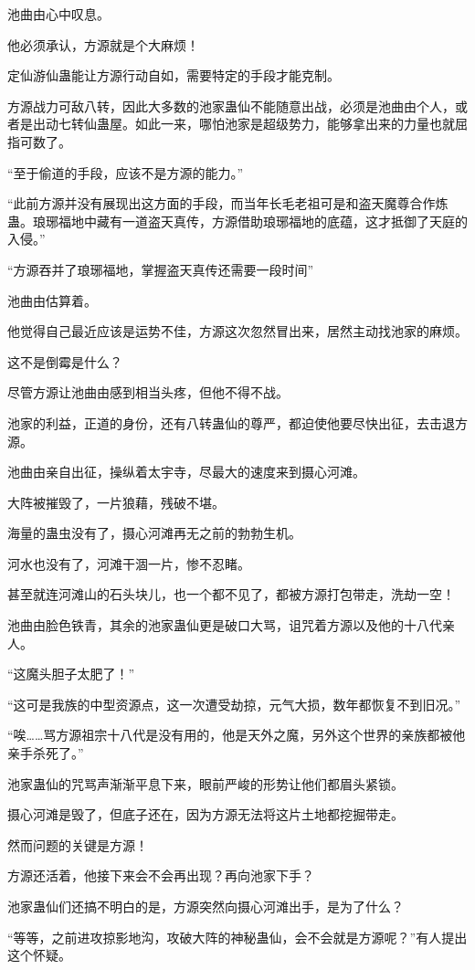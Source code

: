 \begin{this_body}
池曲由心中叹息。

他必须承认，方源就是个大麻烦！

定仙游仙蛊能让方源行动自如，需要特定的手段才能克制。

方源战力可敌八转，因此大多数的池家蛊仙不能随意出战，必须是池曲由个人，或者是出动七转仙蛊屋。如此一来，哪怕池家是超级势力，能够拿出来的力量也就屈指可数了。

“至于偷道的手段，应该不是方源的能力。”

“此前方源并没有展现出这方面的手段，而当年长毛老祖可是和盗天魔尊合作炼蛊。琅琊福地中藏有一道盗天真传，方源借助琅琊福地的底蕴，这才抵御了天庭的入侵。”

“方源吞并了琅琊福地，掌握盗天真传还需要一段时间”

池曲由估算着。

他觉得自己最近应该是运势不佳，方源这次忽然冒出来，居然主动找池家的麻烦。

这不是倒霉是什么？

尽管方源让池曲由感到相当头疼，但他不得不战。

池家的利益，正道的身份，还有八转蛊仙的尊严，都迫使他要尽快出征，去击退方源。

池曲由亲自出征，操纵着太宇寺，尽最大的速度来到摄心河滩。

大阵被摧毁了，一片狼藉，残破不堪。

海量的蛊虫没有了，摄心河滩再无之前的勃勃生机。

河水也没有了，河滩干涸一片，惨不忍睹。

甚至就连河滩山的石头块儿，也一个都不见了，都被方源打包带走，洗劫一空！

池曲由脸色铁青，其余的池家蛊仙更是破口大骂，诅咒着方源以及他的十八代亲人。

“这魔头胆子太肥了！”

“这可是我族的中型资源点，这一次遭受劫掠，元气大损，数年都恢复不到旧况。”

“唉……骂方源祖宗十八代是没有用的，他是天外之魔，另外这个世界的亲族都被他亲手杀死了。”

池家蛊仙的咒骂声渐渐平息下来，眼前严峻的形势让他们都眉头紧锁。

摄心河滩是毁了，但底子还在，因为方源无法将这片土地都挖掘带走。

然而问题的关键是方源！

方源还活着，他接下来会不会再出现？再向池家下手？

池家蛊仙们还搞不明白的是，方源突然向摄心河滩出手，是为了什么？

“等等，之前进攻掠影地沟，攻破大阵的神秘蛊仙，会不会就是方源呢？”有人提出这个怀疑。


\end{this_body}
